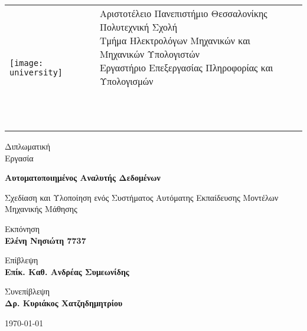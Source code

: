 \begin{titlepage}
	
\begin{tabular}{ll}
	\texttt{[image: university]} &\makecell[l]{ \small Αριστοτέλειο Πανεπιστήμιο Θεσσαλονίκης\\Πολυτεχνική Σχολή\\Τμήμα Ηλεκτρολόγων Μηχανικών και Μηχανικών Υπολογιστών\\Εργαστήριο Επεξεργασίας Πληροφορίας και Υπολογισμών\\
		\\
		\\ \\}
\end{tabular}
\begin{center}	

			
		\vspace{1cm}
		
		\LARGE
		Διπλωματική\\
		Εργασία		
		\vspace{0.3cm}
		
		\Huge
		\textbf{Αυτοματοποιημένος Αναλυτής Δεδομένων}
		
		\vspace{0.3cm}
		\LARGE
		Σχεδίαση και Υλοποίηση ενός Συστήματος Αυτόματης Εκπαίδευσης Μοντέλων Μηχανικής Μάθησης
		
		\vspace{1.5cm}
		
		Εκπόνηση \\
		\textbf{Ελένη Νησιώτη 7737}
		
		\vspace{1.5cm}
		
		Επίβλεψη \\
		\textbf{Επίκ. Καθ. Ανδρέας Συμεωνίδης}
		
		Συνεπίβλεψη \\
		\textbf{Δρ. Κυριάκος Χατζηδημητρίου}
		
		\vspace{1cm}
					
		\today

		
	\end{center}
\end{titlepage}

